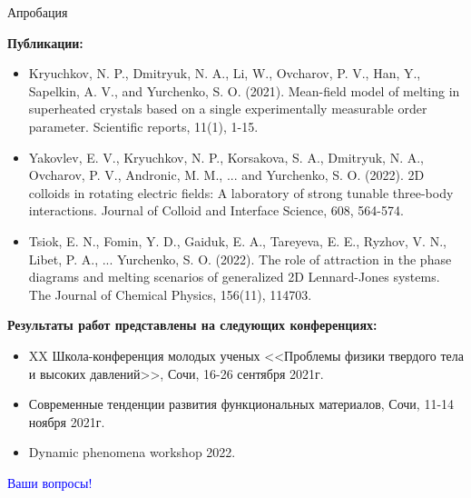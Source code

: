 \documentclass{beamer}
\begin{document}
\begin{frame}{Апробация}
\footnotesize{

\textbf{Публикации:}

\begin{itemize}
    \item Kryuchkov, N. P., Dmitryuk, N. A., Li, W., Ovcharov, P. V., Han, Y., Sapelkin, A. V., and Yurchenko, S. O. (2021). Mean-field model of melting in superheated crystals based on a single experimentally measurable order parameter. Scientific reports, 11(1), 1-15.
    \item Yakovlev, E. V., Kryuchkov, N. P., Korsakova, S. A., Dmitryuk, N. A., Ovcharov, P. V., Andronic, M. M., ... and Yurchenko, S. O. (2022). 2D colloids in rotating electric fields: A laboratory of strong tunable three-body interactions. Journal of Colloid and Interface Science, 608, 564-574.
    \item Tsiok, E. N., Fomin, Y. D., Gaiduk, E. A., Tareyeva, E. E., Ryzhov, V. N., Libet, P. A., ... Yurchenko, S. O. (2022). The role of attraction in the phase diagrams and melting scenarios of generalized 2D Lennard-Jones systems. The Journal of Chemical Physics, 156(11), 114703.
\end{itemize}


\textbf {Результаты работ представлены на следующих конференциях:}

\begin{itemize}
    \item XX Школа-конференция молодых ученых <<Проблемы физики твердого тела и высоких давлений>>, Сочи, 16-26 сентября 2021г.
    \item Современные тенденции развития функциональных материалов, Сочи, 11-14 ноября 2021г.
    \item Dynamic phenomena workshop 2022.
\end{itemize}

}
\end{frame}






\begin{frame}
    \centering \Huge \textcolor{blue}{Ваши вопросы!}
\end{frame}
\end{document}
